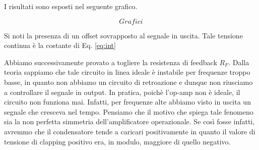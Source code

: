 I risultati sono esposti nel seguente grafico.

$$Grafici$$

Si noti la presenza di un offset sovrapposto al segnale in uscita. Tale tensione continua è la costante di Eq. \eqref{eq:int}



Abbiamo successivamente provato a togliere la resistenza di feedback $R_F$.
Dalla teoria sappiamo che tale circuito in linea ideale è instabile per frequenze troppo basse, in quanto non abbiamo un circuito di retroazione e dunque non riusciamo a controllare il segnale in output.
In pratica, poichè l'op-amp non è ideale, il circuito non funziona mai.
Infatti, per frequenze alte abbiamo visto in uscita un segnale che cresceva nel tempo.
Pensiamo che il motivo che spiega tale fenomeno sia la non perfetta simmetria dell'amplificatore operazionale.
Se così fosse infatti, avremmo che il condensatore tende a caricari positivamente in quanto il valore di tensione di clapping positivo era, in modulo, maggiore di quello negativo.
